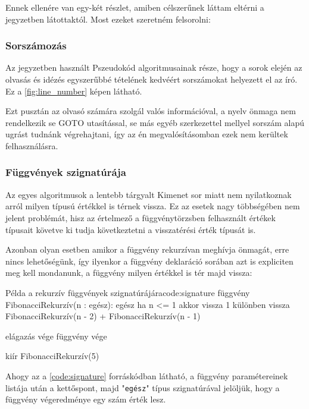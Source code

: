 Ennek ellenére van egy-két részlet, amiben célszerűnek láttam eltérni a jegyzetben látottaktól. Most ezeket szeretném felsorolni:

\subsubsection{Sorszámozás}

Az jegyzetben használt Pszeudokód algoritmusainak része, hogy a sorok elején az olvasás és idézés egyszerűbbé tételének kedvéért sorszámokat helyezett el az író. Ez a \ref{fig:line_number} képen látható.


Ezt pusztán az olvasó számára szolgál valós információval, a nyelv önmaga nem rendelkezik se GOTO utasítással, se más egyéb szerkezettel mellyel sorszám alapú ugrást tudnánk végrehajtani, így az én megvalósításomban ezek nem kerültek felhasználásra.

\subsubsection{Függvények szignatúrája}

Az egyes algoritmusok a lentebb tárgyalt Kimenet sor miatt nem nyilatkoznak arról milyen típusú értékkel is térnek vissza. Ez az esetek nagy többségében nem jelent problémát, hisz az értelmező a függvénytörzsben felhasznált értékek típusait követve ki tudja következtetni a visszatérési érték típusát is.

Azonban olyan esetben amikor a függvény rekurzívan meghívja önmagát, erre nincs lehetőségünk, így ilyenkor a függvény deklaráció sorában azt is expliciten meg kell mondanunk, a függvény milyen értékkel is tér majd vissza:

\begin{code}{Példa a rekurzív függvények szignatúrájára}{code:signature}
függvény FibonacciRekurzív(n : egész): egész
  ha n <= 1 akkor
    vissza 1
  különben
    vissza FibonacciRekurzív(n - 2) + FibonacciRekurzív(n - 1)

  elágazás vége
függvény vége

kiír FibonacciRekurzív(5)
\end{code}

Ahogy az a \ref{code:signature} forráskódban látható, a függvény paramétereinek listája után a kettőspont, majd "\texttt{egész}" típus szignatúrával jelöljük, hogy a függvény végeredménye egy szám érték lesz.

